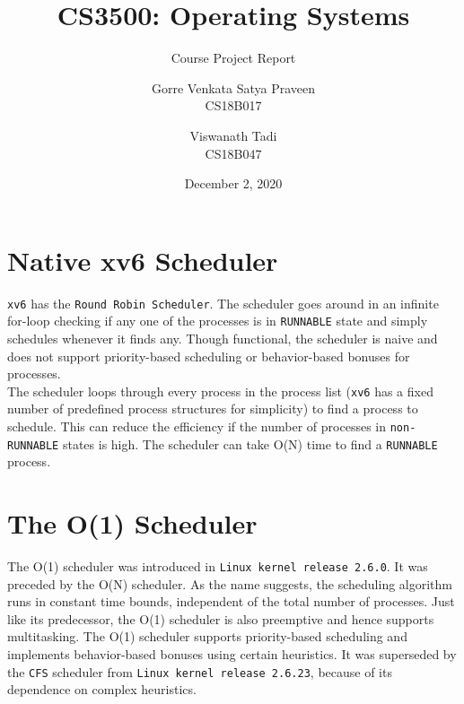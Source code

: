 \documentclass[11pt]{article}
\title{\Huge{CS3500: Operating Systems}}
\subtitle{Course Project Report}{An O(1) Scheduler for xv6}
\author{
  \fontsize{16}{20}\selectfont Gorre Venkata Satya Praveen\\[1ex]
  \fontsize{16}{20}\selectfont CS18B017
  \and
  \fontsize{16}{20}\selectfont Viswanath Tadi\\[1ex]
  \fontsize{16}{20}\selectfont CS18B047
}
\date{\vspace*{35mm}\fontsize{14}{16}\selectfont December 2, 2020}
\begin{document}
\maketitle      %
\pagebreak

\tableofcontents{}
\vspace{20mm}

\section{Native xv6 Scheduler}
\hspace{10mm} \texttt{xv6} has the \texttt{Round Robin Scheduler}. The scheduler goes around in an infinite for-loop checking if any one of the processes is in \texttt{RUNNABLE} state and simply schedules whenever it finds any. Though functional, the scheduler is naive and does not support priority-based scheduling or behavior-based bonuses for processes.\\
\vspace{3mm}
\hspace{10mm} The scheduler loops through every process in the process list (\texttt{xv6} has a fixed number of predefined process structures for simplicity) to find a process to schedule. This can reduce the efficiency if the number of processes in \texttt{non-RUNNABLE} states is high. The scheduler can take O(N) time to find a \texttt{RUNNABLE} process.

\vspace{10mm}
\section{The O(1) Scheduler}
\hspace{10mm} The O(1) scheduler was introduced in \texttt{Linux kernel release 2.6.0}. It was preceded by the O(N) scheduler.
As the name suggests, the scheduling algorithm runs in constant time bounds, independent of the total number of processes. Just like its predecessor, the O(1) scheduler is also preemptive and hence supports multitasking. The O(1) scheduler supports priority-based scheduling and implements behavior-based bonuses using certain heuristics. It was superseded by the \texttt{CFS} scheduler from \texttt{Linux kernel release 2.6.23}, because of its dependence on complex heuristics.

\pagebreak

\end{document}

